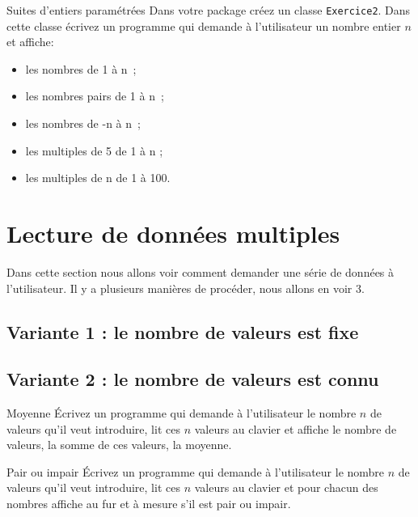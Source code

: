 \documentclass[a4paper,11pt]{article}
\begin{document}
	\begin{Exercice}{Suites d'entiers paramétrées}	
		Dans votre package créez un classe \texttt{Exercice2}.
		Dans cette classe écrivez un programme qui demande à l'utilisateur un nombre entier $n$ et affiche:
		\begin{itemize}
			\item  les nombres de 1 à n~;
			\item  les nombres pairs de 1 à n~;
			\item les nombres de -n à n~;
			\item les multiples de 5 de 1 à n ;
			\item les multiples de n de 1 à 100.
		\end{itemize}
	\end{Exercice}

 
 \section{Lecture de données multiples}
 
 	Dans cette section nous allons voir comment demander une série de données à l'utilisateur.
	Il y a plusieurs manières de procéder, nous allons en voir 3.

	\subsection{Variante 1 : le nombre de valeurs est fixe}


	
	\subsection{Variante 2 : le nombre de valeurs est connu}
	

		\begin{Exercice}{Moyenne}
			\'Ecrivez un programme qui demande à l'utilisateur le nombre $n$ de valeurs qu'il veut introduire,
			lit ces $n$ valeurs au clavier et affiche le nombre de valeurs, la somme de ces valeurs, la moyenne. 
		\end{Exercice}

		\begin{Exercice}{Pair ou impair}
			\'Ecrivez un programme qui demande à l'utilisateur le nombre $n$ de valeurs qu'il veut introduire,
			lit ces $n$ valeurs au clavier et pour chacun des nombres affiche au fur et à mesure s'il est pair ou impair. 
		\end{Exercice}
\end{document}
